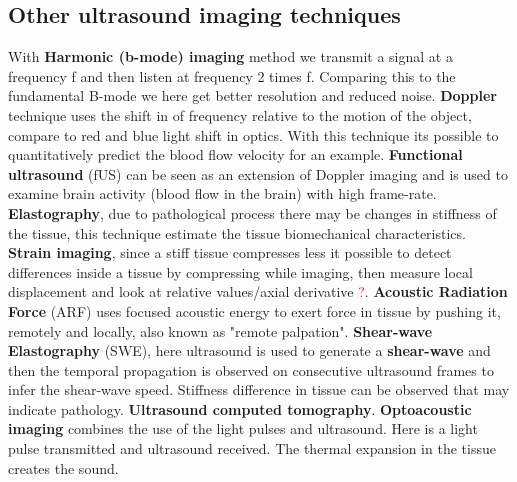 	\subsection{Other ultrasound imaging techniques}
	With \textbf{Harmonic (b-mode) imaging} method we transmit a signal at a frequency f and then listen at frequency 2 times f. Comparing this to the fundamental B-mode we here get better resolution and reduced noise. \textbf{Doppler} technique uses the shift in of frequency relative to the motion of the object, compare to red and blue light shift in optics. With this technique its possible to quantitatively predict the blood flow velocity for an example. \textbf{Functional ultrasound} (fUS) can be seen as an extension of Doppler imaging and is used to examine brain activity (blood flow in the brain) with high frame-rate. \textbf{Elastography}, due to pathological process there may be changes in stiffness of the tissue, this technique estimate the tissue biomechanical characteristics. \textbf{Strain imaging}, since a stiff tissue compresses less it possible to detect differences inside a tissue by compressing while imaging, then measure local displacement and look at relative values/axial derivative \textcolor{red}{?}. \textbf{Acoustic Radiation Force} (ARF) uses focused acoustic energy to exert force in tissue by pushing it, remotely and locally, also known as "remote palpation". \textbf{Shear-wave Elastography} (SWE), here ultrasound is used to generate a \textbf{shear-wave} and then the temporal propagation is observed on consecutive ultrasound frames to infer the shear-wave speed. Stiffness difference in tissue can be observed that may indicate pathology. \textbf{Ultrasound computed tomography}. \textbf{Optoacoustic imaging} combines the use of the light pulses and ultrasound. Here is a light pulse transmitted and ultrasound received. The thermal expansion in the tissue creates the sound.  
















	


